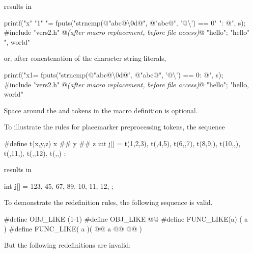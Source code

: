 results in

\begin{codeblock}
printf("x" "1" "= %
fputs("strncmp(@\textbackslash@"abc@\textbackslash\textbackslash@0d@\textbackslash@", @\textbackslash@"abc@\textbackslash@", '@\textbackslash{}') == 0" ": @\atsign\textbackslash@n", s);
#include "vers2.h"    @\textit{(after macro replacement, before file access)}@
"hello";
"hello" ", world"
\end{codeblock}

or, after concatenation of the character string literals,

\begin{codeblock}
printf("x1= %
fputs("strncmp(@\textbackslash@"abc@\textbackslash\textbackslash@0d@\textbackslash@", @\textbackslash@"abc@\textbackslash@", '@\textbackslash{}') == 0: @\atsign\textbackslash@n", s);
#include "vers2.h"    @\textit{(after macro replacement, before file access)}@
"hello";
"hello, world"
\end{codeblock}

Space around the
\tcode{\#}
and
\tcode{\#\#}
tokens in the macro definition is optional.
\exitexample

\pnum
\enterexample
To illustrate the rules for placemarker preprocessing tokens, the sequence

\begin{codeblock}
#define t(x,y,z) x ## y ## z
int j[] = { t(1,2,3), t(,4,5), t(6,,7), t(8,9,),
  t(10,,), t(,11,), t(,,12), t(,,) };
\end{codeblock}

results in

\begin{codeblock}
int j[] = { 123, 45, 67, 89,
  10, 11, 12, };
\end{codeblock}
\exitexample

\pnum
\enterexample
To demonstrate the redefinition rules,
the following sequence is valid.

\begin{codeblock}
#define OBJ_LIKE      (1-1)
#define OBJ_LIKE      @@
#define FUNC_LIKE(a)   ( a )
#define FUNC_LIKE( a )(     @@
                a @@
                  @\tcode{*/}@ )
\end{codeblock}

But the following redefinitions are invalid:

